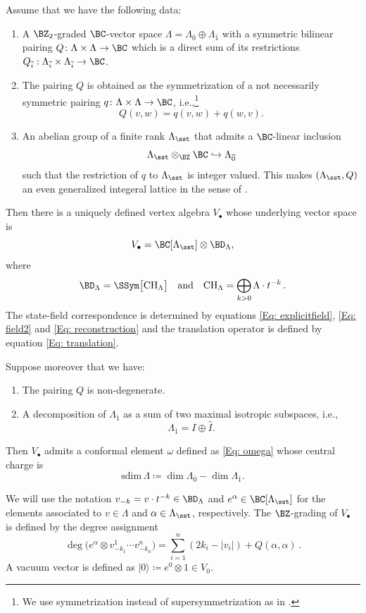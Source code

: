 \begin{theorem}[Kac]
\notready\label{thm: voaconstruction}
Assume that we have the following data:
\begin{enumerate}
    \item A $\BZ_2$-graded $\BC$-vector space $\Lambda=\Lambda_{\overline 0}\oplus \Lambda_{\overline 1}$ with a symmetric bilinear pairing $Q\colon \Lambda\times \Lambda\to \BC$ which is a direct sum of its restrictions $Q_{\overline{i}}:\Lambda_{\overline i}\times \Lambda_{\overline i}\to \BC$.
\item The pairing $Q$ is obtained as the symmetrization of a not necessarily symmetric pairing $q\colon \Lambda\times \Lambda\to \BC$, i.e.,\footnote{We use symmetrization instead of supersymmetrization as in \cite{Gr19}.}
\[Q(v, w)=q(v, w)+q(w, v).\]
\item An abelian group of a finite rank $\Lambda_{\sst}$ that admits a $\BC$-linear inclusion
\[\Lambda_{\sst}\otimes_{\BZ}\BC\hookrightarrow \Lambda_{\overline 0}\]
such that the restriction of $q$ to $\Lambda_\sst$ is integer valued. This makes $(\Lambda_\sst, Q)$ an even generalized integeral lattice in the sense of \cite[Section 3]{Gr19}.
\end{enumerate}
Then there is a uniquely defined vertex algebra $V_\bullet$ whose underlying vector space is
\[V_\bullet=\BC[\Lambda_{\sst}]\otimes \BD_{\Lambda},\]
where
\[\BD_{\Lambda} = \SSym\big[\text{CH}_{\Lambda}\big]\quad\text{and}\quad \text{CH}_{\Lambda}  =\bigoplus_{k>0} \Lambda \cdot t^{-k}\,.\]
The state-field correspondence is determined by equations \eqref{Eq: explicitfield}, \eqref{Eq: field2} and \eqref{Eq: reconstruction} and the translation operator is defined by equation \eqref{Eq: translation}.

Suppose moreover that we have:
\begin{enumerate}
\item[(4)] The pairing $Q$ is non-degenerate.
\item[(5)] A decomposition of $\Lambda_{\overline 1}$ as a sum of two maximal isotropic subspaces, i.e.,
\[\Lambda_{\overline 1}=I\oplus \hat I.\]
\end{enumerate}
Then $V_\bullet$ admits a conformal element $\omega$ defined as \eqref{Eq: omega} whose central charge is
\[\mathrm{sdim}\, \Lambda\coloneqq\dim \Lambda_{\overline 0}-\dim \Lambda_{\overline{1}}.\]
\end{theorem}

We will use the notation $v_{-k}=v \cdot t^{-k}\in \BD_\Lambda$ and $e^\alpha\in \BC[\Lambda_{\sst}]$ for the elements associated to $v\in \Lambda$ and $\alpha\in \Lambda_{\sst}$, respectively. The $\BZ$-grading of $V_\bullet$ is defined by the degree assignment
$$
\deg \Big(e^{\alpha}\otimes v_{-k_1}^1\cdots v_{-k_n}^n\Big) = \sum_{i=1}^n (2k_i-|v_i|) + Q(\alpha,\alpha)\,.
$$
A vacuum vector is defined as $|0\rangle\coloneqq e^0\otimes 1\in V_0$.

